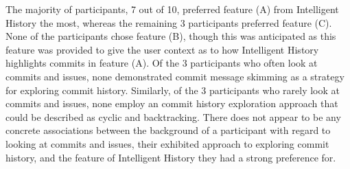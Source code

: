 The majority of participants, 7 out of 10, preferred feature (A) from Intelligent History the most,
whereas the remaining 3 participants preferred feature (C).
None of the participants chose feature (B), though this was anticipated as this feature was provided to give the user context as to how Intelligent History highlights commits in feature (A).
Of the 3 participants who often look at commits and issues, none demonstrated commit message skimming as a strategy for exploring commit history.
Similarly, of the 3 participants who rarely look at commits and issues, none employ an commit history exploration approach that could be described as cyclic and backtracking.
There does not appear to be any concrete associations between the background of a participant with regard to looking at commits and issues,
their exhibited approach to exploring commit history, and the feature of Intelligent History they had a strong preference for.

